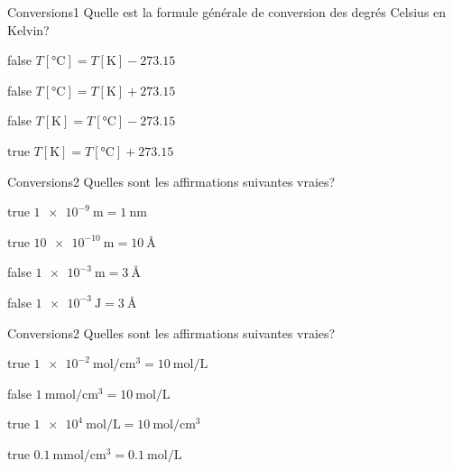 \documentclass[11pt]{article}
\begin{document}
        \begin{question}{}{Conversions}{1}{}
            Quelle est la formule générale de conversion des degrés Celsius en Kelvin?
        \end{question}
        \begin{reponses}
            \item[false] $T[\si{\celsius}] = T[\si{\kelvin}] - \num{273.15}$
            \item[false] $T[\si{\celsius}] = T[\si{\kelvin}] + \num{273.15}$
            \item[false] $T[\si{\kelvin}] = T[\si{\celsius}] - \num{273.15}$
            \item[true] $T[\si{\kelvin}] = T[\si{\celsius}] + \num{273.15}$
        \end{reponses}
        
        \begin{question}{}{Conversions}{2}{}
            Quelles sont les affirmations suivantes vraies?
        \end{question}
        \begin{reponses}
            \item[true] $\SI{1e-9}{\meter} = \SI{1}{\nano\meter}$
            \item[true] $\SI{10e-10}{\meter} = \SI{10}{\angstrom}$
            \item[false] $\SI{1e-3}{\meter} = \SI{3}{\angstrom}$
            \item[false] $\SI{1e-3}{\joule} = \SI{3}{\angstrom}$
        \end{reponses}
		
		\begin{question}{}{Conversions}{2}{}
            Quelles sont les affirmations suivantes vraies?
        \end{question}
        \begin{reponses}
            \item[true] $\SI{1e-2}{\mole\per\centi\meter\cubed} = \SI{10}{\mole\per\liter}$
            \item[false] $\SI{1}{\milli\mole\per\centi\meter\cubed} = \SI{10}{\mole\per\liter}$
            \item[true] $\SI{1e4}{\mole\per\liter} = \SI{10}{\mole\per\centi\meter\cubed}$
            \item[true] $\SI{0.1}{\milli\mole\per\centi\meter\cubed} = \SI{0.1}{\mole\per\liter}$
        \end{reponses}
        
\end{document}
